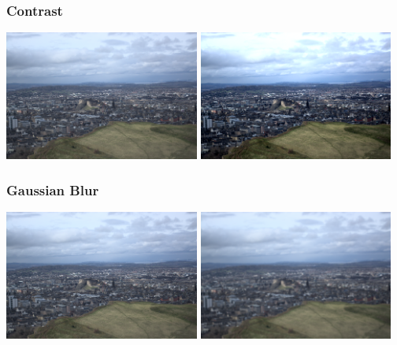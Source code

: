 \documentclass{beamer}
\begin{document}
\begin{frame}
    \frametitle{Contrast}
    \begin{center}
        \includegraphics[width=0.48\textwidth]{default.png}
        \includegraphics[width=0.48\textwidth]{contrast.png}
    \end{center}

\end{frame}

\begin{frame}
    \frametitle{Gaussian Blur}
    \begin{center}
        \includegraphics[width=0.48\textwidth]{default.png}
        \includegraphics[width=0.48\textwidth]{blur.png}
    \end{center}

\end{frame}
\end{document}
